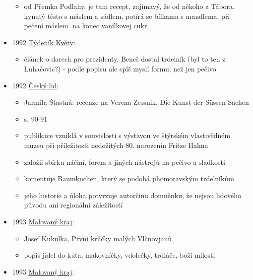 \begin{itemize}
  \begin{itemize}
  \tightlist
  \item
    od Přemka Podlahy, je tam recept, zajímavý, že od někoho z Tábora.
    kynutý těsto s máslem a sádlem, potírá se bílkama s mandlema, při
    pečení máslem. na konec vanilkovej cukr.
  \end{itemize}
\item
  1992
  \href{https://ndk.cz/uuid/uuid:2a7057e0-8b35-11e3-8031-001018b5eb5c}{Týdeník
  Květy}:

  \begin{itemize}
  \tightlist
  \item
    článek o darech pro prezidenty, Beneš dostal trdelník (byl to ten z
    Luhačovic?) - podle popisu ale spíš myslí formu, než jen pečivo
  \end{itemize}
\item
  1992
  \href{https://www.digitalniknihovna.cz/mzk/uuid/uuid:d67cff93-4611-11e1-1586-001143e3f55c}{Český
  lid}:

  \begin{itemize}
  \tightlist
  \item
    Jarmila Šťastná: recenze na Verena Zessnik, Die Kunst der Süssen
    Sachen
  \item
    s. 90-91
  \item
    publikace vzniklá v souvislosti s výstavou ve štýrském vlastivědném
    muzeu při příležitosti nedožitých 80. narozenin Fritze Hahna
  \item
    založil sbírku náčiní, forem a jiných nástrojů na pečivo a sladkosti
  \item
    komentuje Baumkuchen, který se podobá jihomoravským trdelníkům
  \item
    jeho historie a úloha potvrzuje autorčinu domněnku, že nejsou
    lidového původu ani regionální záležitostí
  \end{itemize}
\item
  1993
  \href{https://ceskadigitalniknihovna.cz/uuid/uuid:788f9b30-023f-11e4-97de-5ef3fc9ae867}{Malovaný
  kraj}:

  \begin{itemize}
  \tightlist
  \item
    Josef Kukulka, První krůčky malých Vlčnovjanů
  \item
    popis jídel do kúta, makovníčky, vdolečky, trdláče, boží milosti
  \end{itemize}
\item
  1993
  \href{https://ceskadigitalniknihovna.cz/uuid/uuid:c6a2f3b0-0381-11e4-97de-5ef3fc9ae867}{Malovaný
  kraj}:


\end{itemize}
